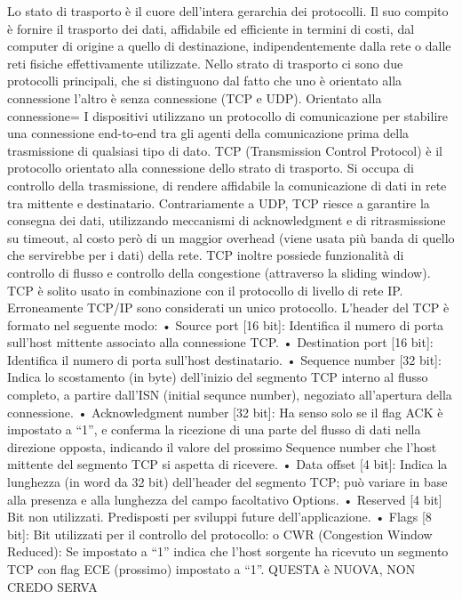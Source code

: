Lo stato di trasporto è il cuore dell’intera gerarchia dei protocolli. Il suo compito è fornire il trasporto dei dati, affidabile ed efficiente in termini di costi, dal computer di origine a quello di destinazione, indipendentemente dalla rete o dalle reti fisiche effettivamente utilizzate.
Nello strato di trasporto ci sono due protocolli principali, che si distinguono dal fatto che uno è orientato alla connessione l’altro è senza connessione (TCP e UDP).
Orientato alla connessione= I dispositivi utilizzano un protocollo di comunicazione per stabilire una connessione end-to-end tra gli agenti della comunicazione prima della trasmissione di qualsiasi tipo di dato.
TCP (Transmission Control Protocol) è il protocollo orientato alla connessione dello strato di trasporto. Si occupa di controllo della trasmissione, di rendere affidabile la comunicazione di dati in rete tra mittente e destinatario.
Contrariamente a UDP, TCP riesce a garantire la consegna dei dati, utilizzando meccanismi di acknowledgment e di ritrasmissione su timeout, al costo però di un maggior overhead (viene usata più banda di quello che servirebbe per i dati) della rete.
TCP inoltre possiede funzionalità di controllo di flusso e controllo della congestione (attraverso la sliding window).
TCP è solito usato in combinazione con il protocollo di livello di rete IP. Erroneamente TCP/IP sono considerati un unico protocollo.
L’header del TCP è formato nel seguente modo:
•	Source port [16 bit]: Identifica il numero di porta sull’host mittente associato alla connessione TCP.
•	Destination port [16 bit]: Identifica il numero di porta sull’host destinatario.
•	Sequence number [32 bit]: Indica lo scostamento (in byte) dell’inizio del segmento TCP interno al flusso completo, a partire dall’ISN (initial sequnce number), negoziato all’apertura della connessione.
•	Acknowledgment number [32 bit]: Ha senso solo se il flag ACK è impostato a “1”, e conferma la ricezione di una parte del flusso di dati nella direzione opposta, indicando il valore del prossimo Sequence number che l’host mittente del segmento TCP si aspetta di ricevere.
•	Data offset [4 bit]: Indica la lunghezza (in word da 32 bit) dell’header del segmento TCP; può variare in base alla presenza e alla lunghezza del campo facoltativo Options.
•	Reserved [4 bit] Bit non utilizzati. Predisposti per sviluppi future dell’applicazione.
•	Flags [8 bit]: Bit utilizzati per il controllo del protocollo:
o	CWR (Congestion Window Reduced): Se impostato a “1” indica che l’host sorgente ha ricevuto un segmento TCP con flag ECE (prossimo) impostato a “1”. 
QUESTA è NUOVA, NON CREDO SERVA
